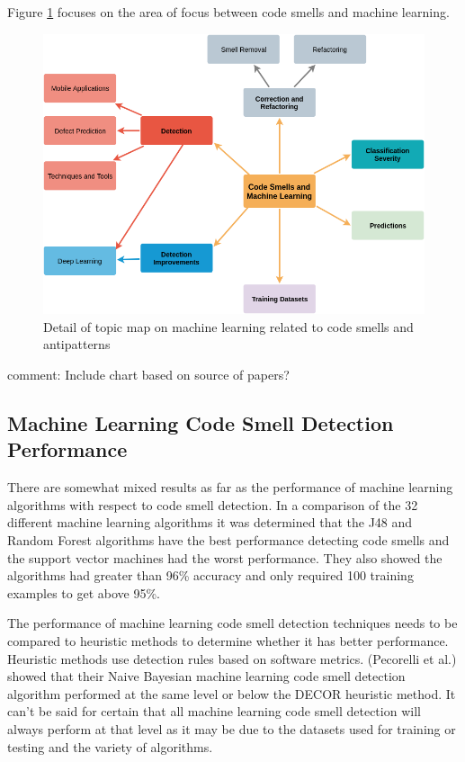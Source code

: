 \documentclass[conference]{IEEEtran}
\begin{document}
Figure \ref{fig:ML} focuses on the area of focus between code smells and machine learning.

\begin{figure}[!ht]
  \centerline{\includegraphics[width=\textwidth]{ML-codesmells11-23.png}}
  \caption{Detail of topic map on machine learning related to code smells and antipatterns}
  \label{fig:ML}
\end{figure} 

comment: Include chart based on source of papers?

\subsection{Machine Learning Code Smell Detection Performance}
There are somewhat mixed results as far as the performance of machine learning algorithms with respect to code smell detection\cite{nucci_detecting_2018}.
In a comparison of the 32 different machine learning algorithms\cite{arcelli_fontana_comparing_2016} it was determined that the J48 and Random Forest algorithms have the best performance detecting code smells and the support vector machines had the worst performance. They also showed the algorithms had greater than 96\% accuracy and only required 100 training examples to get above 95\%.

The performance of machine learning code smell detection techniques needs to be compared to heuristic methods to determine whether it has better performance. Heuristic methods use detection rules based on software metrics. (Pecorelli et al.) showed\cite{pecorelli_comparing_2019} that their Naive Bayesian machine learning code smell detection algorithm performed at the same level or below the DECOR heuristic method. 
It can't be said for certain that all machine learning code smell detection will always perform at that level as it may be due to the datasets used for training or testing and the variety of algorithms.
\end{document}
